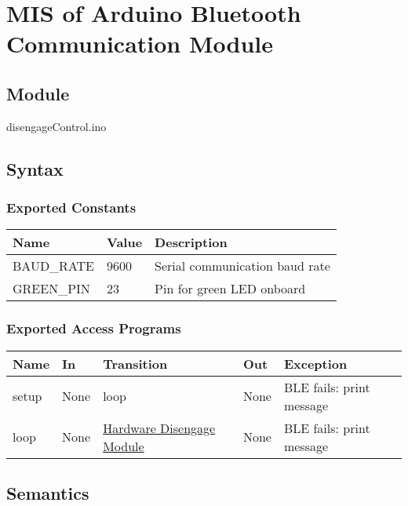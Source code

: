 \documentclass[12pt, titlepage]{article}
\begin{document}
\newpage




\section{MIS of Arduino Bluetooth Communication Module} \label{mABC}

\subsection{Module}
disengageControl.ino

\subsection{Syntax}

\subsubsection{Exported Constants}

\begin{center}
\begin{tabular}{p{4cm} p{2cm} p{6cm}}
\hline
\textbf{Name} & \textbf{Value} & \textbf{Description} \\
\hline
BAUD\_RATE & 9600 & Serial communication baud rate \\
GREEN\_PIN & 23 & Pin for green LED onboard \\
\hline
\end{tabular}
\end{center}

\subsubsection{Exported Access Programs}

\begin{center}
\begin{tabular}{p{2cm} p{2cm} p{2cm} p{2cm} p{5cm}}
\hline
\textbf{Name} & \textbf{In} & \textbf{Transition} & \textbf{Out} & \textbf{Exception} \\
\hline
setup & None & loop & None & BLE fails: print message  \\
loop & None & \hyperref[mHD]{Hardware Disengage Module} & None & BLE fails: print message \\
\hline
\end{tabular}
\end{center}

\subsection{Semantics}
\end{document}
